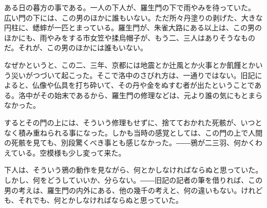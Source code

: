 \begin{cjkAbstract}
    ある日の暮方の事である。一人の下人が、羅生門の下で雨やみを待っていた。
    広い門の下には、この男のほかに誰もいない。ただ所々丹塗りの剥げた、大きな円柱に、蟋蟀が一匹とまっている。羅生門が、朱雀大路にある以上は、この男のほかにも、雨やみをする市女笠や揉烏帽子が、もう二、三人はありそうなものだ。それが、この男のほかには誰もいない。

    なぜかというと、この二、三年、京都には地震とか辻風とか火事とか飢饉とかいう災いがつづいて起こった。そこで洛中のさびれ方は、一通りではない。旧記によると、仏像や仏具を打ち砕いて、その丹や金をぬすむ者が出たということである。洛中がその始末であるから、羅生門の修理などは、元より誰の気にもとまらなかった。

    するとその門の上には、そういう修理もせずに、捨てておかれた死骸が、いつとなく積み重ねられる事になった。しかも当時の感覚としては、この門の上で人間の死骸を見ても、別段驚くべき事とも感じなかった。――鴉が二三羽、何かくわえている。空模様も少し変って来た。

    下人は、そういう鴉の動作を見ながら、何とかしなければならぬと思っていた。
    しかし、何をどうしていいか、分らない。――旧記の記者の筆を借りれば、この男の考えは、羅生門の内外にある、他の幾千の考えと、何の違いもない。けれども、それでも、何とかしなければならぬと思っていた。
    \cjkAbstractKeywords
\end{cjkAbstract}
